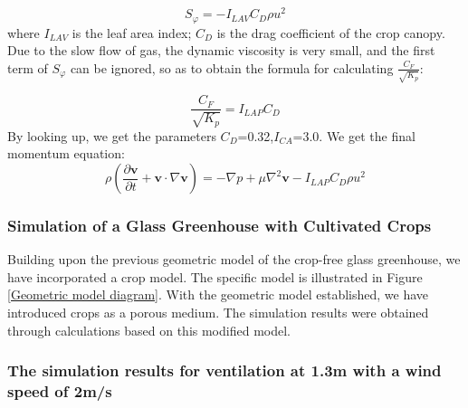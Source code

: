 \documentclass{apmcmthesis}
\begin{document}
{   $$S_\varphi =-I_{LAV}C_D\rho u^2$$
where $I_{LAV}$ is the leaf area index; $C_D$ is the drag coefficient of the crop canopy. Due to the slow flow of gas, the dynamic viscosity is very small, and the first term of $S_\varphi$ can be ignored, so as to obtain the formula for calculating $\frac{C_F}{\sqrt{K_p}}$:

   $$\frac{C_F}{\sqrt{K_p} } =I_{LAP}C_D$$
By looking up, we get the parameters $C_D$=0.32,$I_{CA}$=3.0.
We get the final momentum equation:
   $$\begin{equation}
\rho \left(\frac{\partial \mathbf{v}}{\partial t} + \mathbf{v} \cdot \nabla \mathbf{v}\right) = -\nabla p + \mu \nabla^2 \mathbf{v} - I_{LAP}C_D \rho u^2 
\end{equation}$$
\subsubsection{Simulation of a Glass Greenhouse with Cultivated Crops}

Building upon the previous geometric model of the crop-free glass greenhouse, we have incorporated a crop model. The specific model is illustrated in Figure \ref{Geometric model diagram}. With the geometric model established, we have introduced crops as a porous medium. The simulation results were obtained through calculations based on this modified model.

\subsubsection*{The simulation results for ventilation at 1.3m with a wind speed of 2m/s}

\begin{figure}[htbp]
      \centering
\end{figure}}
\end{document}

